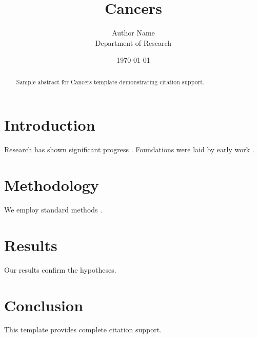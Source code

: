 \documentclass{mdpi}
\title{Cancers}
\author{Author Name \\ \small Department of Research}
\date{\today}
\begin{document}
\maketitle

\begin{abstract}
Sample abstract for Cancers template demonstrating citation support.
\end{abstract}

\section{Introduction}
Research has shown significant progress \citep{einstein1905}. Foundations were laid by early work \citep{turing1950}.

\section{Methodology}
We employ standard methods \citep{knuth1984}.

\section{Results}
Our results confirm the hypotheses.

\section{Conclusion}
This template provides complete citation support.



\end{document}
